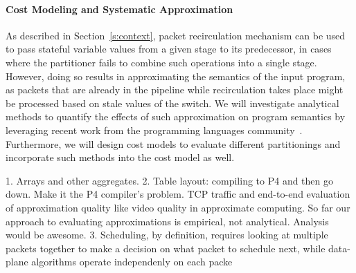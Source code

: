 \paragraph{Cost Modeling and Systematic Approximation}
As described in Section~\ref{s:context}, 
packet recirculation mechanism can be used to pass stateful variable values  
from a given stage to its predecessor,
in cases where the partitioner fails to combine such
operations into a single stage.
However, doing so results in approximating the semantics of
the input \pktlanguage program, as packets that are already in the pipeline 
while recirculation takes place might be processed based on stale values of the
switch. We will investigate analytical methods to quantify the effects of
such approximation on program semantics by leveraging recent work from
the programming languages community~\cite{sampsonApprox, chisel}. 
Furthermore, we will design cost
models to evaluate different partitionings and incorporate such methods into
the cost model as well. 


1. Arrays and other aggregates.
2. Table layout: compiling to P4 and then go down. Make it the P4 compiler's problem.
TCP traffic and end-to-end evaluation of approximation quality like video quality in approximate computing.
So far our approach to evaluating approximations is empirical, not analytical. Analysis would be awesome.
3. Scheduling, by definition, requires looking at multiple packets together to
make a decision on what packet to schedule next, while data-plane algorithms
operate independenly on each packe
\fi
